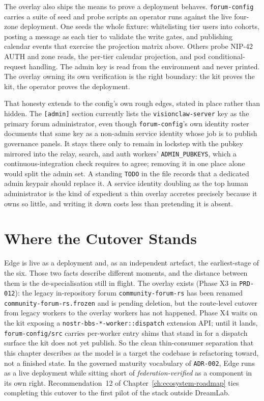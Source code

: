 The overlay also ships the means to prove a deployment behaves. \texttt{forum-config} carries a suite of seed and probe scripts an operator runs against the live four-zone deployment. One seeds the whole fixture: whitelisting tier users into cohorts, posting a message as each tier to validate the write gates, and publishing calendar events that exercise the projection matrix above. Others probe NIP-42 AUTH and zone reads, the per-tier calendar projection, and pod conditional-request handling. The admin key is read from the environment and never printed. The overlay owning its own verification is the right boundary: the kit proves the kit, the operator proves the deployment.

That honesty extends to the config's own rough edges, stated in place rather than hidden. The \texttt{[admin]} section currently lists the \texttt{visionclaw-server} key as the primary forum administrator, even though \texttt{forum-config}'s own identity roster documents that same key as a non-admin service identity whose job is to publish governance panels. It stays there only to remain in lockstep with the pubkey mirrored into the relay, search, and auth workers' \texttt{ADMIN\_PUBKEYS}, which a continuous-integration check requires to agree; removing it in one place alone would split the admin set. A standing \texttt{TODO} in the file records that a dedicated admin keypair should replace it. A service identity doubling as the top human administrator is the kind of expedient a thin overlay accretes precisely because it owns so little, and writing it down costs less than pretending it is absent.

\section{Where the Cutover Stands}

Edge is live as a deployment and, as an independent artefact, the earliest-stage of the six. Those two facts describe different moments, and the distance between them is the de-specialisation still in flight. The overlay exists (Phase X3 in \texttt{PRD-012}): the legacy in-repository forum \texttt{community-forum-rs} has been renamed \texttt{community-forum-rs.frozen} and is pending deletion, but the route-level cutover from legacy workers to the overlay workers has not happened. Phase X4 waits on the kit exposing a \texttt{nostr-bbs-*-worker::dispatch} extension API; until it lands, \texttt{forum-config/src} carries per-worker entry shims that stand in for a dispatch surface the kit does not yet publish. So the clean thin-consumer separation that this chapter describes as the model is a target the codebase is refactoring toward, not a finished state. In the governed maturity vocabulary of \texttt{ADR-002}, Edge runs as a live deployment while sitting short of \emph{federation-verified} as a component in its own right. Recommendation~12 of Chapter~\ref{ch:ecosystem-roadmap} ties completing this cutover to the first pilot of the stack outside DreamLab.

